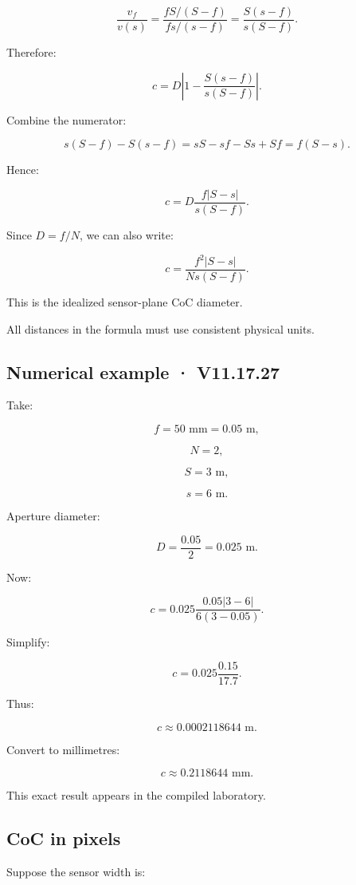 \[ \frac{v_f}{v(s)} = \frac{fS/(S-f)}{fs/(s-f)} = \frac{S(s-f)}{s(S-f)}. \]

Therefore:

\[ c=D \left| 1-\frac{S(s-f)}{s(S-f)} \right|. \]

Combine the numerator:

\[ s(S-f)-S(s-f) = sS-sf-Ss+Sf =f(S-s). \]

Hence:

\[ \boxed{ c= D\frac{f|S-s|}{s(S-f)}. } \]

Since \(D=f/N\), we can also write:

\[ \boxed{ c= \frac{f^2|S-s|} {Ns(S-f)}. } \]

This is the idealized sensor-plane CoC diameter.

All distances in the formula must use consistent physical units.

\subsection{Numerical example · V11.17.27}\label{02-foundations-ii-ch036-numerical-example-v11.17.27}

Take:

\[ f=50\text{ mm}=0.05\text{ m}, \]

\[ N=2, \]

\[ S=3\text{ m}, \]

\[ s=6\text{ m}. \]

Aperture diameter:

\[ D=\frac{0.05}{2}=0.025\text{ m}. \]

Now:

\[ c= 0.025 \frac{ 0.05|3-6| }{ 6(3-0.05) }. \]

Simplify:

\[ c= 0.025 \frac{0.15}{17.7}. \]

Thus:

\[ c\approx0.0002118644\text{ m}. \]

Convert to millimetres:

\[ \boxed{ c\approx0.2118644\text{ mm}. } \]

This exact result appears in the compiled laboratory.

\subsection{CoC in pixels}\label{02-foundations-ii-ch036-coc-in-pixels}

Suppose the sensor width is:

